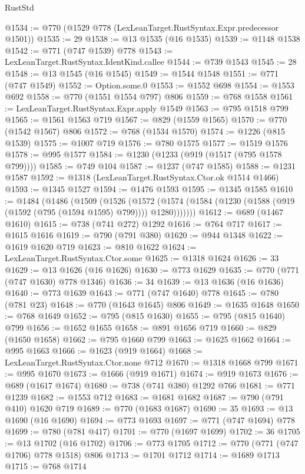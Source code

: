 \begin{lexlean}{RustStd}
\begin{coremodule}
@1534 := @770 (@1529 @778 (LexLeanTarget.RustSyntax.Expr.predecessor @1501))
@1535 := 29
@1538 := @13 @1535 (@16 @1535)
@1539 := @1148 @1538
@1542 := @771 (@747 @1539) @778
@1543 := LexLeanTarget.RustSyntax.IdentKind.callee
@1544 := @739 @1543
@1545 := 28
@1548 := @13 @1545 (@16 @1545)
@1549 := @1544 @1548
@1551 := @771 (@747 @1549)
@1552 := Option.some.{0}
@1553 := @1552 @698
@1554 := @1553 @692
@1558 := @770 (@1551 @1554 @797) @806
@1559 := @768 @1558
@1561 := LexLeanTarget.RustSyntax.Expr.apply @1549
@1563 := @795 @1518 @799
@1565 := @1561 @1563 @719
@1567 := @829 (@1559 @1565)
@1570 := @770 (@1542 @1567) @806
@1572 := @768 (@1534 @1570)
@1574 := @1226 (@815 @1539)
@1575 := @1007 @719
@1576 := @780 @1575
@1577 := @1519 @1576
@1578 := @995 @1577
@1584 := @1230 (@1233 (@919 (@1517 (@795 @1578 @799))))
@1585 := @749 @104
@1587 := @1237 (@747 @1585)
@1588 := @1231 @1587
@1592 := @1318 (LexLeanTarget.RustSyntax.Ctor.ok @1514 @1466)
@1593 := @1345 @1527
@1594 := @1476 @1593
@1595 := @1345 @1585
@1610 := @1484
    (@1486
      (@1509
        (@1526
          (@1572 (@1574 (@1584 (@1230 (@1588 (@919 (@1592 (@795 (@1594 @1595) @799)))) @1280)))))))
@1612 := @689 (@1467 @1610)
@1615 := @738 (@741 @272) @1292
@1616 := @764 @717
@1617 := @1615 @1616
@1619 := @790 (@791 @380)
@1620 := @944 @1348
@1622 := @1619 @1620 @719
@1623 := @810 @1622
@1624 := LexLeanTarget.RustSyntax.Ctor.some
@1625 := @1318 @1624
@1626 := 33
@1629 := @13 @1626 (@16 @1626)
@1630 := @773 @1629
@1635 := @770 (@771 (@747 @1630) @778 @1346)
@1636 := 34
@1639 := @13 @1636 (@16 @1636)
@1640 := @773 @1639
@1643 := @771 (@747 @1640) @778
@1645 := @780 (@781 @23)
@1648 := @770 (@1643 @1645) @806
@1649 := @1635 @1648
@1650 := @768 @1649
@1652 := @795 (@815 @1630)
@1655 := @795 (@815 @1640) @799
@1656 := @1652 @1655
@1658 := @891 @1656 @719
@1660 := @829 (@1650 @1658)
@1662 := @795 @1660 @799
@1663 := @1625 @1662
@1664 := @995 @1663
@1666 := @1623 (@919 @1664)
@1668 := LexLeanTarget.RustSyntax.Ctor.none @712
@1670 := @1318 @1668 @799
@1671 := @995 @1670
@1673 := @1666 (@919 @1671)
@1674 := @919 @1673
@1676 := @689 (@1617 @1674)
@1680 := @738 (@741 @380) @1292 @766
@1681 := @771 @1239
@1682 := @1553 @712
@1683 := @1681 @1682
@1687 := @790 (@791 @410) @1620 @719
@1689 := @770 (@1683 @1687)
@1690 := 35
@1693 := @13 @1690 (@16 @1690)
@1694 := @773 @1693
@1697 := @771 (@747 @1694) @778
@1699 := @780 (@781 @417)
@1701 := @770 (@1697 @1699)
@1702 := 36
@1705 := @13 @1702 (@16 @1702)
@1706 := @773 @1705
@1712 := @770 (@771 (@747 @1706) @778 @1518) @806
@1713 := @1701 @1712
@1714 := @1689 @1713
@1715 := @768 @1714

\end{coremodule}
\end{lexlean}
